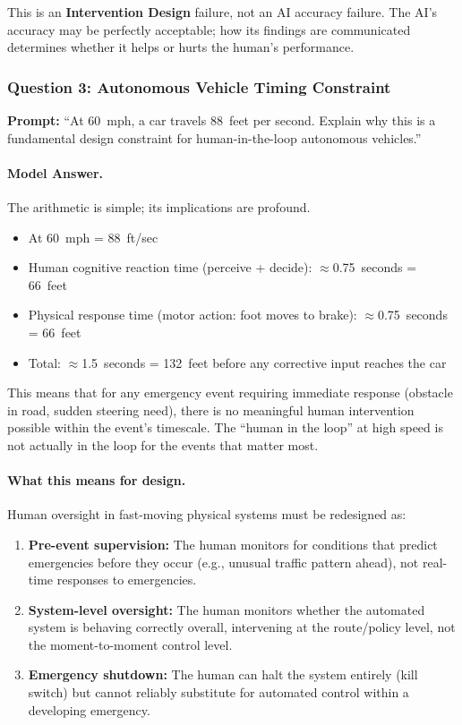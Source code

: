 This is an \textbf{Intervention Design} failure, not an AI accuracy failure. The AI's accuracy may be perfectly acceptable; how its findings are communicated determines whether it helps or hurts the human's performance.

\subsubsection{Question 3: Autonomous Vehicle Timing Constraint}

\textbf{Prompt:} ``At 60~mph, a car travels 88~feet per second. Explain why this is a fundamental design constraint for human-in-the-loop autonomous vehicles.''

\paragraph{Model Answer.}

The arithmetic is simple; its implications are profound.

\begin{itemize}
    \item At 60~mph = 88~ft/sec
    \item Human cognitive reaction time (perceive + decide): $\approx$0.75~seconds = 66~feet
    \item Physical response time (motor action: foot moves to brake): $\approx$0.75~seconds = 66~feet
    \item Total: $\approx$1.5~seconds = 132~feet before any corrective input reaches the car
\end{itemize}

This means that for any emergency event requiring immediate response (obstacle in road, sudden steering need), there is no meaningful human intervention possible within the event's timescale. The ``human in the loop'' at high speed is not actually in the loop for the events that matter most.

\paragraph{What this means for design.}

Human oversight in fast-moving physical systems must be redesigned as:
\begin{enumerate}
    \item \textbf{Pre-event supervision:} The human monitors for conditions that predict emergencies before they occur (e.g., unusual traffic pattern ahead), not real-time responses to emergencies.
    \item \textbf{System-level oversight:} The human monitors whether the automated system is behaving correctly overall, intervening at the route/policy level, not the moment-to-moment control level.
    \item \textbf{Emergency shutdown:} The human can halt the system entirely (kill switch) but cannot reliably substitute for automated control within a developing emergency.
\end{enumerate}

